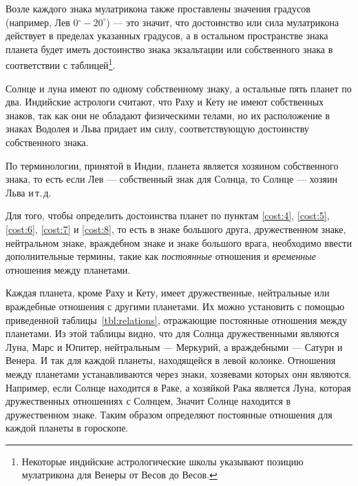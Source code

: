 Возле каждого знака мулатрикона также проставлены значения градусов (например, Лев \(0{^\circ}-20^\circ\)) --- это значит, что достоинство или сила мулатрикона действует в пределах указанных градусов, а в остальном пространстве знака планета будет иметь достоинство знака экзальтации или собственного знака в соответствии с таблицей\footnote{Некоторые индийские астрологические школы указывают позицию мулатрикона для Венеры от  Весов до  Весов.}.

Солнце и луна имеют по одному собственному знаку, а остальные пять планет по два. Индийские астрологи считают, что Раху и Кету не имеют собственных знаков, так как они не обладают физическими телами, но их расположение в знаках Водолея и Льва придает им силу, соответствующую достоинству собственного знака.

По терминологии, принятой в Индии, планета является хозяином собственного знака, то есть если Лев --- собственный знак для Солнца, то Солнце --- хозяин Льва и\,т.\,д.

Для того, чтобы определить достоинства планет по пунктам \ref{cost:4}, \ref{cost:5}, \ref{cost:6}, \ref{cost:7} и \ref{cost:8}, то есть в знаке большого друга, дружественном знаке, нейтральном знаке, враждебном знаке и знаке большого врага, необходимо ввести дополнительные термины, такие как \emph{постоянные} отношения и \emph{временные} отношения между планетами.

Каждая планета, кроме Раху и Кету, имеет дружественные, нейтральные или враждебные отношения с другими планетами. Их можно установить с помощью приведенной таблицы~\ref{tbl:relations}, отражающие постоянные отношения между планетами. Из этой таблицы видно, что для Солнца дружественными являются Луна, Марс и Юпитер, нейтральным --- Меркурий, а враждебными --- Сатурн и Венера. И так для каждой планеты, находящейся в левой колонке. Отношения между планетами устанавливаются через знаки, хозяевами которых они являются. Например, если Солнце находится в Раке, а хозяйкой Рака является Луна, которая дружественных отношениях с Солнцем, Значит Солнце находится в дружественном знаке. Таким образом определяют постоянные отношения для каждой планеты в гороскопе.

